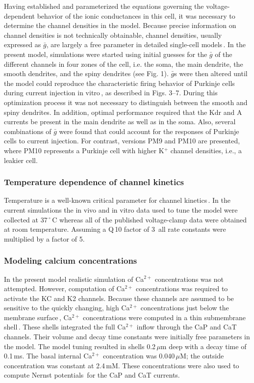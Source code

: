 \documentclass[12pt]{article}
\begin{document}
Having established and parameterized the equations governing the
voltage-dependent behavior of the ionic conductances in this
cell, it was necessary to determine the channel densities in the
model. Because precise information on channel densities is not
technically obtainable, channel densities, usually expressed as $\bar g$,
are largely a free parameter in detailed single-cell models\,\cite{S:1993dz, L:1992kl, W:1991qa, Traub-R-D:1991mi}.
In the present model, simulations were started using initial
guesses for the $\bar g$ of the different channels in four zones of the cell,
i.e. the soma, the main dendrite, the smooth dendrites, and the
spiny dendrites (see Fig. 1). $\bar g$s were then altered until the model
could reproduce the characteristic firing behavior of Purkinje cells
during current injection in vitro\,\cite{R:1980ly, R:1980pi},
as described in Figs. 3--7. During this optimization
process it was not necessary to distinguish between
the smooth and spiny dendrites. In addition, optimal performance
required that the Kdr and A currents be present in the
main dendrite as well as in the soma.
Also, several combinations of $\bar g$ were found that could account for
the responses of Purkinje cells to current injection. For contrast,
versions PM9 and PM10 are presented, where PM10 represents
a Purkinje cell with higher K$^+$ channel densities, i.e., a leakier
cell.

\subsubsection*{Temperature dependence of channel kinetics}

Temperature
is a well-known critical parameter for channel kinetics\,\cite{B:1991zr}.
In the current simulations the in vivo and in vitro data
used to tune the model were collected at 37\,$^\circ$\,C whereas all of the
published voltage-clamp data were obtained at room temperature.
Assuming a Q\,10 factor of 3\,\cite{L:1952fv} all rate constants were multiplied by a factor of 5.

\subsubsection*{Modeling calcium concentrations}

In the present model realistic simulation of Ca$^{2+}$ concentrations was not attempted. However, computation of Ca$^{2+}$ concentrations was required to activate the
KC and K2 channels. Because these channels are assumed to be
sensitive to the quickly changing, high Ca$^{2+}$ concentrations just
below the membrane surface\,\cite{L:1989ff}, Ca$^{2+}$ concentrations were 
computed in a thin submembrane shell\,\cite{D:1982lh}. These shells integrated the full Ca$^{2+}$ inflow through
the CaP and CaT channels. Their volume and decay time constants
were initially free parameters in the model. The model tuning
resulted in shells 0.2\,$\mu$m deep with a decay time of 0.1\,ms.
The basal internal Ca$^{2+}$ concentration was 0.040\,$\mu$M; the outside
concentration was constant at 2.4\,mM. These concentrations
were also used to compute Nernst potentials\,\cite{B:1991zr} for the
CaP and CaT currents.



\end{document}
